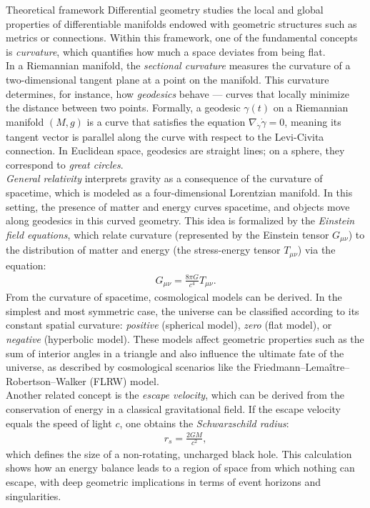 \documentclass[final]{beamer}
\newlength{\colwidth}
\begin{document}
\begin{frame}[t]
\begin{columns}[t]
\begin{column}{\colwidth}
  \begin{block}{Theoretical framework}
    Differential geometry studies the local and global properties of differentiable manifolds endowed with geometric structures such as metrics or connections. Within this framework, one of the fundamental concepts is \textit{curvature}, which quantifies how much a space deviates from being flat.\\
    In a Riemannian manifold, the \textit{sectional curvature} measures the curvature of a two-dimensional tangent plane at a point on the manifold. This curvature determines, for instance, how \textit{geodesics} behave — curves that locally minimize the distance between two points. Formally, a geodesic $\gamma(t)$ on a Riemannian manifold $(M,g)$ is a curve that satisfies the equation $\nabla_{\dot{\gamma}}\dot{\gamma} = 0$, meaning its tangent vector is parallel along the curve with respect to the Levi-Civita connection. In Euclidean space, geodesics are straight lines; on a sphere, they correspond to \textit{great circles}.\\
    \textit{General relativity} interprets gravity as a consequence of the curvature of spacetime, which is modeled as a four-dimensional Lorentzian manifold. In this setting, the presence of matter and energy curves spacetime, and objects move along geodesics in this curved geometry. This idea is formalized by the \textit{Einstein field equations}, which relate curvature (represented by the Einstein tensor $G_{\mu\nu}$) to the distribution of matter and energy (the stress-energy tensor $T_{\mu\nu}$) via the equation:
    \begin{align*}
      G_{\mu\nu} = \frac{8\pi G}{c^4} T_{\mu\nu}.
    \end{align*}
    From the curvature of spacetime, cosmological models can be derived. In the simplest and most symmetric case, the universe can be classified according to its constant spatial curvature: \textit{positive} (spherical model), \textit{zero} (flat model), or \textit{negative} (hyperbolic model). These models affect geometric properties such as the sum of interior angles in a triangle and also influence the ultimate fate of the universe, as described by cosmological scenarios like the Friedmann–Lemaître–Robertson–Walker (FLRW) model.\\
    Another related concept is the \textit{escape velocity}, which can be derived from the conservation of energy in a classical gravitational field. If the escape velocity equals the speed of light $c$, one obtains the \textit{Schwarzschild radius}:
    \begin{align*}
      r_s = \frac{2GM}{c^2},
    \end{align*}
    which defines the size of a non-rotating, uncharged black hole. This calculation shows how an energy balance leads to a region of space from which nothing can escape, with deep geometric implications in terms of event horizons and singularities.  
  \end{block}
\end{column}


\end{columns}
\end{frame}
\end{document}
